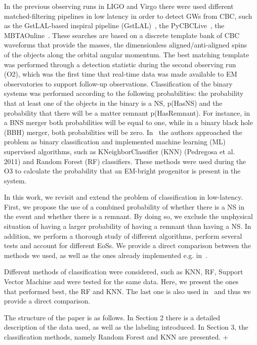 
   
 
In the previous observing runs in LIGO and Virgo there were used different matched-filtering pipelines in low latency in order to detect GWs from CBC, such as the GstLAL-based inspiral pipeline (GstLAL)~\cite{Sachdev:2020lfd}, the PyCBCLive~\cite{Nitz_2018}, the MBTAOnline~\cite{Adams_2016}. These searches are based on a discrete template bank of CBC waveforms that provide the masses, the dimensionless aligned/anti-aligned spins of the objects along the orbital angular momentum. The best matching template was performed through a detection statistic during the second observing run (O2), which was the first time that real-time data was made available to EM observatories to support follow-up observations. Classification of the binary systems was performed according to the following probabilities: the probability that at least one of the objects in the binary is a NS, p(HasNS) and the probability that there will be a matter remnant p(HasRemnant). For instance, in a BNS merger both probabilities will be equal to one, while in a binary black hole (BBH) merger, both probabilities will be zero. In~\cite{Chatterjee:2019avs} the authors approached the problem as binary classification and implemented machine learning (ML) supervised algorithms, such as KNeighborClassifier (KNN) (Pedregosa et al. 2011) and Random Forest (RF) classifiers. These methods were used during the O3 to calculate the probability that an EM-bright progenitor is present in the system.


In this work, we revisit and extend the problem of classification in low-latency. First, we propose the use of a combined probability of whether there is a NS in the event and whether there is a remnant. By doing so, we exclude the unphysical situation of having a larger probability of having a remnant than having a NS. In addition, we perform a thorough study of different algorithms, perform several tests and account for different EoSs. We provide a direct comparison between the methods we used, as well as the ones already implemented e.g. in~\cite{Chatterjee:2019avs}. 

Different methods of classification were considered, such as KNN, RF, Support Vector Machine and were tested for the same data. Here, we present the ones that performed best, the RF and KNN. The last one is also used in~\cite{Chatterjee:2019avs} and thus we provide a direct comparison. 

The structure of the paper is as follows. In Section 2 there is a detailed description of the data used, as well as the labeling introduced. In Section 3, the classification methods, namely Random Forest and KNN are presented. +   
